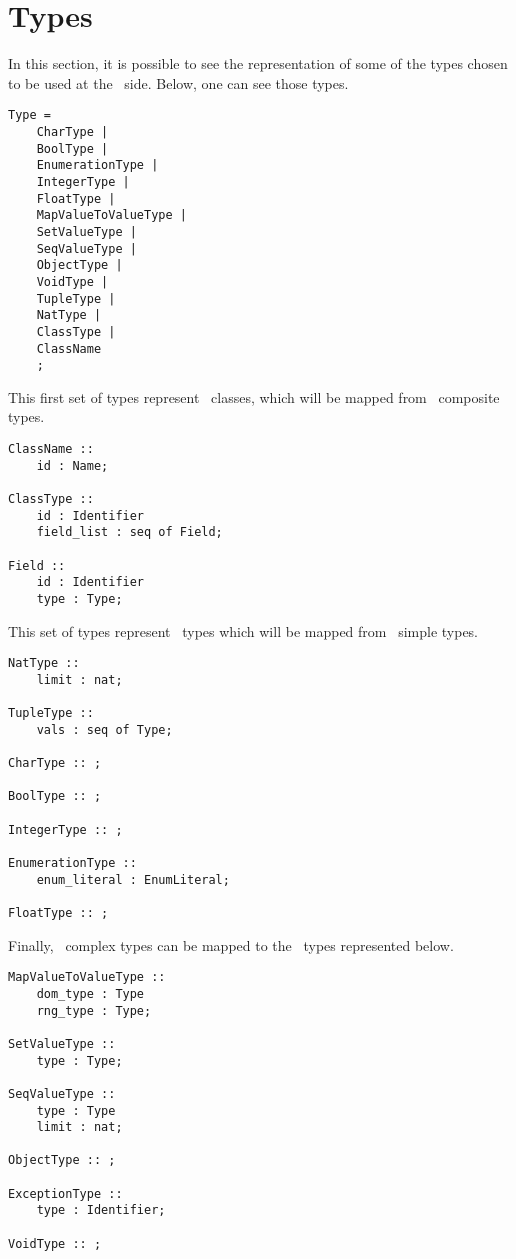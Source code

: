 \section{Types}

In this section, it is possible to see the representation of some of the types chosen to be used at the \jml\ side. Below, one can see those types.

\begin{lstlisting}
Type =
	CharType |
	BoolType |
	EnumerationType | 
	IntegerType |
	FloatType |
	MapValueToValueType | 
	SetValueType |
	SeqValueType |
	ObjectType |
	VoidType |
	TupleType |
	NatType |
	ClassType |
	ClassName
	;
\end{lstlisting}

This first set of types represent \jml\ classes, which will be mapped from \vpp\ composite types.

\begin{lstlisting}
ClassName ::
	id : Name;

ClassType ::
	id : Identifier
	field_list : seq of Field;

Field ::
	id : Identifier
	type : Type;
\end{lstlisting}

This set of types represent \jml\ types which will be mapped from \vpp\ simple types.

\begin{lstlisting}
NatType :: 
	limit : nat;

TupleType ::
	vals : seq of Type;

CharType :: ;

BoolType :: ;

IntegerType :: ;

EnumerationType ::
	enum_literal : EnumLiteral;

FloatType :: ;
\end{lstlisting}

Finally, \vpp\ complex types can be mapped to the \jml\ types represented below.

\begin{lstlisting}
MapValueToValueType ::
	dom_type : Type
	rng_type : Type;

SetValueType ::
	type : Type;

SeqValueType ::
	type : Type
	limit : nat;

ObjectType :: ;

ExceptionType ::
    type : Identifier;

VoidType :: ;
\end{lstlisting}

